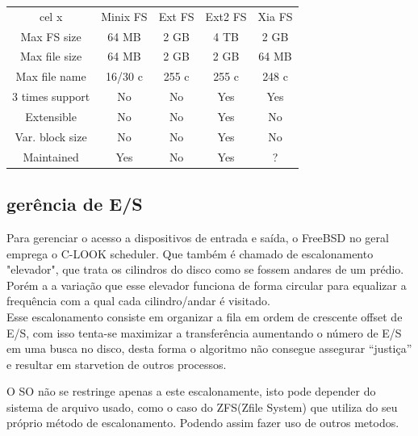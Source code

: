 \documentclass[conference]{IEEEtran}
\begin{document}
\begin{center}
	\begin{tabular}{c|c|c|c|c}
		\hline
		cel x & Minix FS & Ext FS & Ext2 FS & Xia FS \\
		Max FS size & 64 MB & 2 GB & 4 TB & 2 GB \\
		Max file size & 64 MB & 2 GB & 2 GB & 64 MB \\
		Max file name & 16/30 c & 255 c &255 c & 248 c \\
		3 times support & No & No & Yes & Yes \\
		Extensible & No & No & Yes & No \\
		Var. block size & No & No & Yes & No \\
		Maintained & Yes & No & Yes & ?
	\end{tabular}
\end{center}

\subsection{gerência de E/S}\label{sec:BSDES}
Para gerenciar o acesso a dispositivos de entrada e saída, o FreeBSD no geral emprega o C-LOOK scheduler\cite{FreeBSD-Hybrid}. Que também é chamado de escalonamento "elevador", que trata os cilindros do disco como se fossem andares de um prédio. Porém a a variação que esse elevador funciona de forma circular para equalizar a frequência com a qual cada cilindro/andar é visitado.\\

Esse escalonamento consiste em organizar a fila em ordem de crescente offset de E/S, com isso tenta-se maximizar a transferência aumentando o número de E/S em uma busca no disco, desta forma o algoritmo não consegue assegurar “justiça” e resultar em starvetion de outros processos.
 
O SO não se restringe apenas a este escalonamente, isto pode depender do sistema de arquivo usado, como o caso do ZFS(Zfile System) que utiliza do seu próprio método de escalonamento. Podendo assim fazer uso de outros metodos. \\
\end{document}
